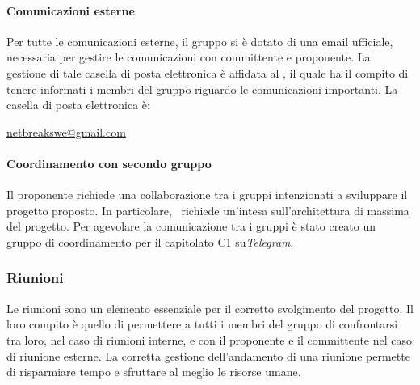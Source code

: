 			\paragraph{Comunicazioni esterne}
			Per tutte le comunicazioni esterne, il gruppo \textit{\gruppo} si è dotato di una email ufficiale, necessaria per gestire le comunicazioni con committente e proponente. La gestione di tale casella di posta elettronica è affidata al \textit{\RdP}, il quale ha il compito di tenere informati i membri del gruppo riguardo le comunicazioni importanti. La casella di posta elettronica è:
			\begin{center}
				\url{netbreakswe@gmail.com} 
			\end{center}
		\paragraph{Coordinamento con secondo gruppo}
			Il proponente richiede una collaborazione tra i gruppi intenzionati a sviluppare il progetto proposto. In particolare, \proponente\ richiede un'intesa sull'architettura di massima del progetto. Per agevolare la comunicazione tra i gruppi è stato creato un gruppo di coordinamento per il capitolato C1 su\textit{Telegram}.
			
		\subsubsection{Riunioni}
		Le riunioni sono un elemento essenziale per il corretto svolgimento del progetto. Il loro compito è quello di permettere a tutti i membri del gruppo di confrontarsi tra loro, nel caso di riunioni interne, e con il proponente e il committente nel caso di riunione esterne. La corretta gestione dell'andamento di una riunione permette di risparmiare tempo e sfruttare al meglio le risorse umane.
		
